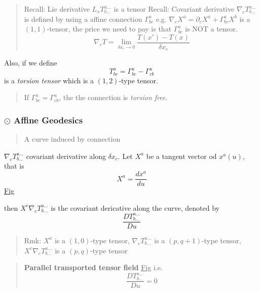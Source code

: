 \begin{quote}
	Recall: Lie derivative $L_{x}T^{a\ldots}_{b\ldots}$ is a tensor
Recall: Covariant derivative $\nabla_{c} T^{a\ldots}_{b\ldots}$ is defined by  using a affine connection $\Gamma^{a}_{bc}$
e.g. $\nabla_{c}X^{a} = \partial_{c}X^{a} + \Gamma^{a}_{bc} X^{b}$ is a $(1,1)$-tensor, the price we need to pay is that $\Gamma^{a}_{bc}$ is NOT a tensor.
\begin{equation}
\nabla_{c} T = \lim_{\delta x_c \to 0} \frac{T(x')-T(x)}{\delta x_{c}}
\end{equation}

\end{quote}
Also, if we define
\begin{equation}
T^{a}_{bc} = \Gamma^{a}_{bc} - \Gamma^{a}_{cb}
\end{equation}
is a \textit{torsion tensor} which is a $(1,2)$-type tensor.

\begin{quote}
	If $\Gamma^{a}_{bc} = \Gamma^{a}_{cb}$, the the connection is \textit{torsion free}.
\end{quote}

\subsubsection{$\odot$ Affine Geodesics} %

\begin{quote}
	A curve induced by connection
\end{quote}

$\nabla_{c} T^{a\ldots}_{b\ldots}$ covariant derivative along $\delta x_{c}$. Let $X^{a}$ be a tangent vector od $x^{a}(u)$, that is 
\begin{equation}
X^{a} = \frac{dx^{a}}{du}
\end{equation}
\underline{Fig}

then $X^{c}\nabla_{c} T^{a\ldots}_{b\ldots}$ is the covariant dericative along the curve, denoted by
\begin{equation}
\frac{DT^{a\ldots}_{b\ldots}}{Du}
\end{equation}


\begin{quote}
	Rmk:
$X^{a}$ is a $(1,0)$-type tensor, $\nabla_{c}T^{a\ldots}_{b\ldots}$ is a $(p,q+1)$-type tensor, $X^{c}\nabla_{c}T^{a\ldots}_{b\ldots}$ is a $(p,q)$-type tensor
\end{quote}

\begin{quote}
	\textbf{Parallel transported tensor field}
\underline{Fig}
i.e.
\begin{equation}
\frac{DT^{a\ldots}_{b\ldots}}{Du} = 0
\end{equation}

\end{quote}

